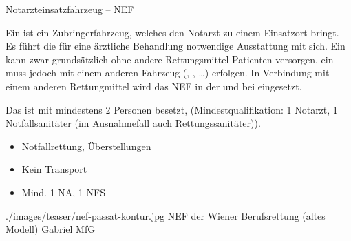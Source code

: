 \TextSlideTeaser
{Notarzteinsatzfahrzeug -- NEF}%
{%
%
%
Ein  ist ein Zubringerfahrzeug, welches den Notarzt
zu einem Einsatzort bringt. Es führt die für eine ärztliche
Behandlung notwendige Ausstattung mit sich. Ein 
kann zwar grundsätzlich ohne andere Rettungsmittel Patienten
versorgen, ein  muss jedoch mit einem anderen
Fahrzeug (, , \ldots) erfolgen.
%
In Verbindung mit einem anderen Rettungmittel wird das NEF in der 
 und bei
eingesetzt.

Das  ist mit mindestens 2 Personen besetzt,
(Mindestqualifikation: 1 Notarzt, 1 Notfallsanitäter (im
Ausnahmefall auch Rettungssanitäter)).
}%
{
\begin{itemize}
  \item Notfallrettung, Überstellungen 
  \item Kein Transport
  \item Mind. 1 NA, 1 NFS
\end{itemize}}%
{./images/teaser/nef-passat-kontur.jpg}%
{NEF der Wiener Berufsrettung (altes Modell)}%
{}%
{Gabriel}%
{MfG}%

\begin{Synopsis}
\end{Synopsis}


